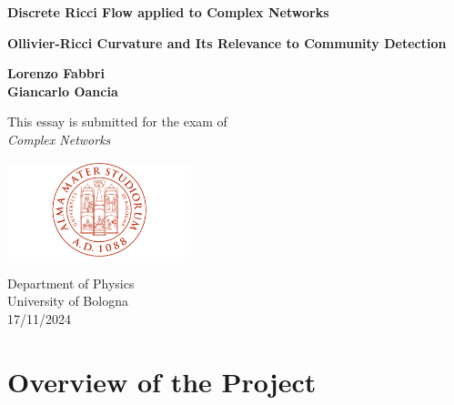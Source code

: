 \documentclass[a4paper,12pt,twoside,online,customfont,custombib,PageStyleI]{Settings/PhDThesisPSnPDF}
\begin{document}
\begin{titlepage}
    \begin{center}
        \vspace*{1cm}
            
        \Huge
        \textbf{Discrete Ricci Flow applied to Complex Networks}
            
        \vspace{0.5cm}
        \large
        \textbf{Ollivier-Ricci Curvature and Its Relevance to Community Detection}
            
        \vspace{1.5cm}
        \Large    
        \textbf{Lorenzo Fabbri \\ Giancarlo Oancia}
            
        \vfill
        \large   
        This essay is submitted for the exam of\\
        \textit{Complex Networks}
            
        \vspace{0.8cm}
            
        \includegraphics[width=0.4\textwidth]{Graphics/UniversityCrest.png}
            
        \large
        Department of Physics\\
        University of Bologna\\
        17/11/2024
            
    \end{center}
\end{titlepage}

\frontmatter



\begin{spacing}{1.3}
    \tableofcontents
\end{spacing}

\mainmatter
\chapter{Overview of the Project}

\end{document}
